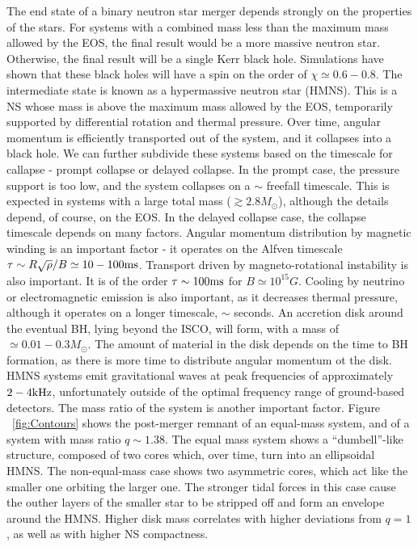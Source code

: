 The end state of a binary neutron star merger depends strongly on the properties of the stars. For systems with a combined mass less than the maximum mass allowed by the EOS, the final result would be a more massive neutron star. Otherwise, the final result will be a single Kerr black hole. Simulations have shown that these black holes will have a spin on the order of $\chi \simeq 0.6-0.8$. The intermediate state is known as a hypermassive neutron star (HMNS). This is a NS whose mass is above the maximum mass allowed by the EOS, temporarily supported by differential rotation and thermal pressure. Over time, angular momentum is efficiently transported out of the system, and it collapses into a black hole. We can further subdivide these systems based on the timescale for callapse - prompt collapse or delayed collapse. In the prompt case, the pressure support is too low, and the system collapses on a $\sim$ freefall timescale. This is expected in systems with a large total mass ($\gtrsim 2.8M_{\odot}$), although the details depend, of course, on the EOS. In the delayed collapse case, the collapse timescale depends on many factors. Angular momentum distribution by magnetic winding is an important factor - it operates on the Alfven timescale $\tau \sim R\sqrt{\rho}/B \simeq 10-100{\rm ms}$. Transport driven by magneto-rotational instability is also important. It is of the order $\tau \sim 100{\rm ms}$ for $B \simeq 10^{15}G$. Cooling by neutrino or electromagnetic emission is also important, as it decreases thermal pressure, although it operates on a longer timescale, $\sim$ seconds. An accretion disk around the eventual BH, lying beyond the ISCO, will form, with a mass of $\simeq 0.01-0.3 M_{\odot}$. The amount of material in the disk depends on the time to BH formation, as there is more time to distribute angular momentum ot the disk. HMNS systems emit gravitational waves at peak frequencies of approximately $2-4 {\rm kHz}$, unfortunately outside of the optimal frequency range of ground-based detectors. The mass ratio of the system is another important factor. Figure ~\ref{fig:Contours} shows the post-merger remnant of an equal-mass system, and of a system with mass ratio $q\sim 1.38$. The equal mass system shows a ``dumbell''-like structure, composed of two cores which, over time, turn into an ellipsoidal HMNS. The non-equal-mass case shows two asymmetric cores, which act like the smaller one orbiting the larger one. The stronger tidal forces in this case cause the outher layers of the smaller star to be stripped off and form an envelope around the HMNS. Higher disk mass correlates with higher deviations from $q=1$, as well as with higher NS compactness.


